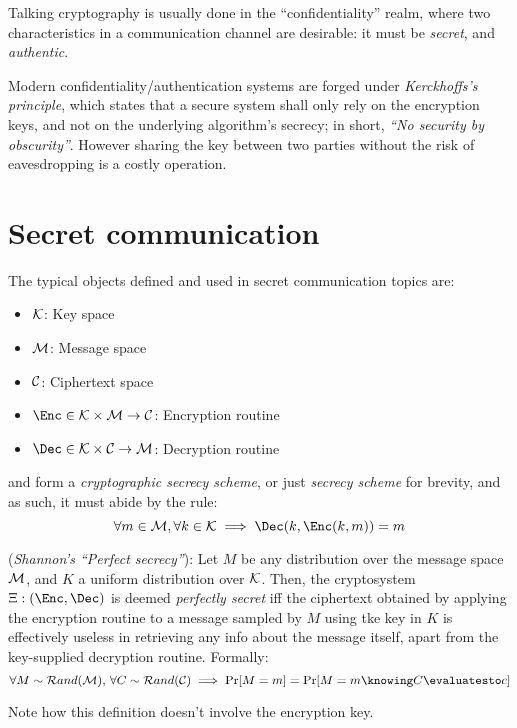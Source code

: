 
Talking cryptography is usually done in the ``confidentiality'' realm, where two characteristics in a communication channel are desirable: it must be \emph{secret}, and \emph{authentic}.

Modern confidentiality/authentication systems are forged under \emph{Kerckhoffs's principle}, which states that a secure system shall only rely on the encryption keys, and not on the underlying algorithm's secrecy; in short, \emph{``No security by obscurity''}. However sharing the key between two parties without the risk of eavesdropping is a costly operation.

\section{Secret communication}


The typical objects defined and used in secret communication topics are:
\begin{itemize}
    \item $\mathcal{K}$: Key space
    \item $\mathcal{M}$: Message space
    \item $\mathcal{C}$: Ciphertext space
    \item $\Enc \in \K \times \M \to \C$: Encryption routine
    \item $\Dec \in \K \times \C \to \M$: Decryption routine
\end{itemize}

\Enc{} and \Dec{} form a \emph{cryptographic secrecy scheme}, or just \emph{secrecy scheme} for brevity, and as such, it must abide by the rule:
\[
    \forall m \in \M, \forall k \in \K \implies \Dec(k, \Enc(k, m)) = m
\]

\begin{definition}
    (\textit{Shannon's ``Perfect secrecy''}): Let $M$ be any distribution over the message space $\mathcal{M}$, and $K$ a uniform distribution over $\mathcal{K}$. Then, the cryptosystem $\Xi: (\Enc, \Dec)$ is deemed \emph{perfectly secret} iff the ciphertext obtained by applying the encryption routine to a message sampled by $M$ using tke key in $K$ is effectively useless in retrieving any info about the message itself, apart from the key-supplied decryption routine. Formally:
    \[
        \forall M \sim \mathcal{R}and(\M),\, \forall C \sim \mathcal{R}and(\C) \implies \Pr[M = m] = \Pr[M = m \knowing C \evaluatesto c]
    \]
\end{definition}
Note how this definition doesn't involve the encryption key. %

